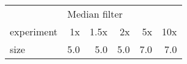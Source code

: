 \begin{tabular}{lrrrrr}
\toprule
{} & \multicolumn{5}{l}{Median filter} \\
experiment &            1x & 1.5x &   2x &   5x &  10x \\
\midrule
size &           5.0 &  5.0 &  5.0 &  7.0 &  7.0 \\
\bottomrule
\end{tabular}
